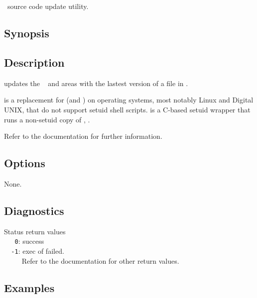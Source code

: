 \newpage
\section{}
\label{sau}

\aipspp\ source code update utility.

\subsection*{Synopsis}

\begin{synopsis}
\end{synopsis}

\subsection*{Description}

 updates the \aipspp\  and  areas with the
lastest version of a file in .

 is a replacement for  (and )
on operating systems, most notably Linux and Digital UNIX, that do not
support setuid shell scripts.   is a C-based setuid wrapper
that runs a non-setuid copy of , .

Refer to the  documentation for further information.

\subsection*{Options}

None.

\subsection*{Diagnostics}

Status return values
\\ \verb+   0+: success
\\ \verb+  -1+: exec of  failed.
\\ \verb+     +Refer to the  documentation for other return values.

\subsection*{Examples}


